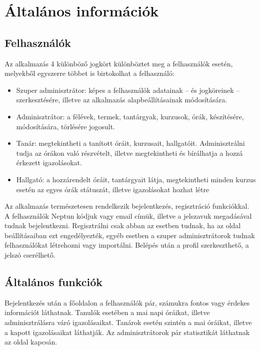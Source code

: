 \documentclass[
]{thesis-ekf}
\theoremstyle{definition}
\theoremstyle{remark}
\begin{document}
\section{Általános információk}

\subsection{Felhasználók}
\label{users}

Az alkalmazás 4 különböző jogkört különböztet meg a felhasználók esetén, melyekből egyszerre többet is birtokolhat a felhasználó:

\begin{itemize}
	\item Szuper adminisztrátor: képes a felhasználók adatainak -- és jogköreinek -- szerkesztésére, illetve az alkalmazás alapbeállításainak módosítására.
	\item Adminisztrátor: a félévek, termek, tantárgyak, kurzusok, órák, készítésére, módosítására, törlésére jogosult.
	\item Tanár: megtekintheti a tanított óráit, kurzusait, hallgatóit. Adminisztrálni tudja az órákon való részvételt, illetve megtekintheti és bírálhatja a hozzá érkezett igazolásokat.
	\item Hallgató: a hozzárendelt óráit, tantárgyait látja, megtekintheti minden kurzus esetén az egyes órák státuszát, illetve igazolásokat hozhat létre
\end{itemize}

Az alkalmazás természetesen rendelkezik bejelentkezés, regisztráció funkciókkal. A felhasználók Neptun\cite{Neptun} kódjuk vagy email címük, illetve a jelszavuk megadásával tudnak bejelentkezni. Regisztrálni csak abban az esetben tudnak, ha az oldal beállításaiban ezt engedélyezték, egyéb esetben a szuper adminisztrátorok tudnak felhasználókat létrehozni vagy importálni. Belépés után  a profil szerkeszthető, a jelszó cserélhető.

\subsection{Általános funkciók}

Bejelentkezés után a főoldalon a felhasználók pár, számukra fontos vagy érdekes információt láthatnak. Tanulók esetében a mai napi óráikat, illetve adminisztrálásra váró igazolásaikat. Tanárok esetén szintén a mai óráikat, illetve a kapott igazolásaikat láthatják. Az adminisztrátorok pár statisztikát láthatnak az oldal kapcsán.
\end{document}
